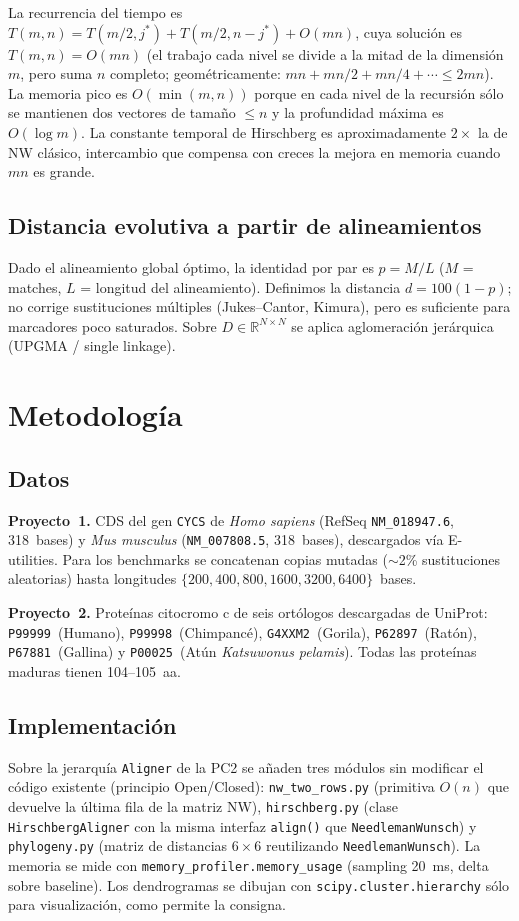 \documentclass[11pt,a4paper]{article}
\begin{document}
\noindent
La recurrencia del tiempo es $T(m,n) = T(m/2, j^*) + T(m/2, n-j^*) + O(mn)$, cuya soluci\'on es $T(m,n) = O(mn)$ (el trabajo cada nivel se divide a la mitad de la dimensi\'on $m$, pero suma $n$ completo; geom\'etricamente: $mn + mn/2 + mn/4 + \cdots \le 2mn$). La memoria pico es $O(\min(m,n))$ porque en cada nivel de la recursi\'on s\'olo se mantienen dos vectores de tama\~no $\le n$ y la profundidad m\'axima es $O(\log m)$. La constante temporal de Hirschberg es aproximadamente $2\times$ la de NW cl\'asico, intercambio que compensa con creces la mejora en memoria cuando $mn$ es grande.

\subsection{Distancia evolutiva a partir de alineamientos}
Dado el alineamiento global \'optimo, la identidad por par es $p = M/L$ ($M$ = matches, $L$ = longitud del alineamiento). Definimos la distancia $d = 100(1-p)$; no corrige sustituciones m\'ultiples (Jukes--Cantor, Kimura), pero es suficiente para marcadores poco saturados. Sobre $D \in \mathbb{R}^{N\times N}$ se aplica aglomeraci\'on jer\'arquica (UPGMA / single linkage).

\section{Metodolog\'ia}

\subsection{Datos}
\textbf{Proyecto~1.} CDS del gen \texttt{CYCS} de \emph{Homo sapiens} (RefSeq \texttt{NM\_018947.6}, 318~bases) y \emph{Mus musculus} (\texttt{NM\_007808.5}, 318~bases), descargados v\'ia E-utilities. Para los benchmarks se concatenan copias mutadas ($\sim$2\% sustituciones aleatorias) hasta longitudes $\{200, 400, 800, 1600, 3200, 6400\}$~bases.

\textbf{Proyecto~2.} Prote\'inas citocromo c de seis ort\'ologos descargadas de UniProt: \texttt{P99999}~(Humano), \texttt{P99998}~(Chimpanc\'e), \texttt{G4XXM2}~(Gorila), \texttt{P62897}~(Rat\'on), \texttt{P67881}~(Gallina) y \texttt{P00025}~(At\'un \emph{Katsuwonus pelamis}). Todas las prote\'inas maduras tienen 104--105~aa.

\subsection{Implementaci\'on}
Sobre la jerarqu\'ia \texttt{Aligner} de la PC2 se a\~naden tres m\'odulos sin modificar el c\'odigo existente (principio Open/Closed): \texttt{nw\_two\_rows.py} (primitiva $O(n)$ que devuelve la \'ultima fila de la matriz NW), \texttt{hirschberg.py} (clase \texttt{HirschbergAligner} con la misma interfaz \texttt{align()} que \texttt{NeedlemanWunsch}) y \texttt{phylogeny.py} (matriz de distancias $6{\times}6$ reutilizando \texttt{NeedlemanWunsch}). La memoria se mide con \texttt{memory\_profiler.memory\_usage} (sampling 20~ms, delta sobre baseline). Los dendrogramas se dibujan con \texttt{scipy.cluster.hierarchy} s\'olo para visualizaci\'on, como permite la consigna.
\end{document}
